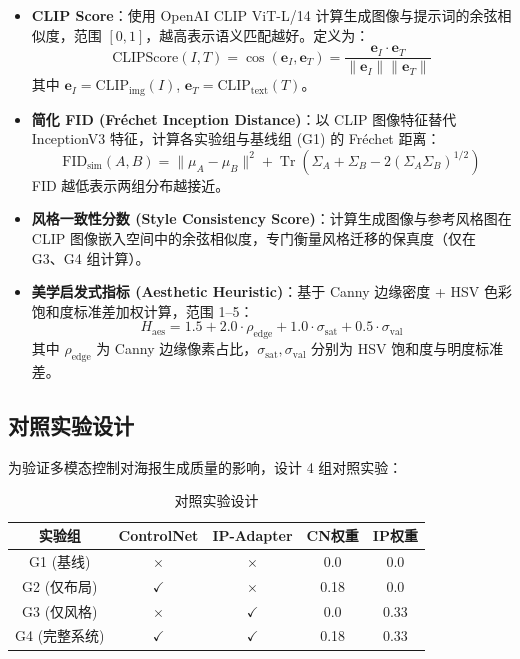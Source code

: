 \documentclass[10pt,a4paper]{article}
\begin{document}
\begin{itemize}[itemsep=0pt,topsep=2pt]
    \item \textbf{CLIP Score}：使用 OpenAI CLIP ViT-L/14 计算生成图像与提示词的余弦相似度，范围 $[0,1]$，越高表示语义匹配越好。定义为：
    \begin{equation}
        \text{CLIPScore}(I, T) = \cos(\mathbf{e}_I, \mathbf{e}_T) = \frac{\mathbf{e}_I \cdot \mathbf{e}_T}{\|\mathbf{e}_I\| \|\mathbf{e}_T\|}
    \end{equation}
    其中 $\mathbf{e}_I = \text{CLIP}_{\text{img}}(I)$, $\mathbf{e}_T = \text{CLIP}_{\text{text}}(T)$。

    \item \textbf{简化 FID (Fréchet Inception Distance)}：以 CLIP 图像特征替代 InceptionV3 特征，计算各实验组与基线组 (G1) 的 Fréchet 距离：
    \begin{equation}
        \text{FID}_{\text{sim}}(A, B) = \|\mu_A - \mu_B\|^2 + \operatorname{Tr}\left(\Sigma_A + \Sigma_B - 2(\Sigma_A \Sigma_B)^{1/2}\right)
    \end{equation}
    FID 越低表示两组分布越接近。

    \item \textbf{风格一致性分数 (Style Consistency Score)}：计算生成图像与参考风格图在 CLIP 图像嵌入空间中的余弦相似度，专门衡量风格迁移的保真度（仅在 G3、G4 组计算）。

    \item \textbf{美学启发式指标 (Aesthetic Heuristic)}：基于 Canny 边缘密度 + HSV 色彩饱和度标准差加权计算，范围 1--5：
    \begin{equation}
        H_{\text{aes}} = 1.5 + 2.0 \cdot \rho_{\text{edge}} + 1.0 \cdot \sigma_{\text{sat}} + 0.5 \cdot \sigma_{\text{val}}
    \end{equation}
    其中 $\rho_{\text{edge}}$ 为 Canny 边缘像素占比，$\sigma_{\text{sat}}, \sigma_{\text{val}}$ 分别为 HSV 饱和度与明度标准差。
\end{itemize}

\subsection{对照实验设计}

为验证多模态控制对海报生成质量的影响，设计 4 组对照实验：

\begin{table}[H]
\centering
\caption{对照实验设计}
\label{tab:experiments}
\begin{tabular}{@{}ccccc@{}}
\toprule
\textbf{实验组} & \textbf{ControlNet} & \textbf{IP-Adapter} & \textbf{CN权重} & \textbf{IP权重} \\
\midrule
G1 (基线)        & $\times$ & $\times$ & 0.0  & 0.0  \\
G2 (仅布局)      & $\checkmark$ & $\times$ & 0.18 & 0.0  \\
G3 (仅风格)      & $\times$ & $\checkmark$ & 0.0  & 0.33 \\
G4 (完整系统)    & $\checkmark$ & $\checkmark$ & 0.18 & 0.33 \\
\bottomrule
\end{tabular}
\end{table}
\end{document}

